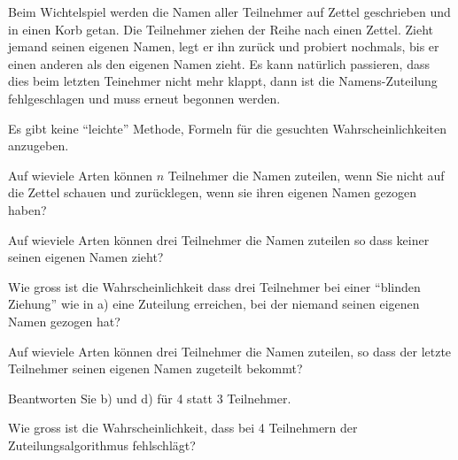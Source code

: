 Beim Wichtelspiel werden die Namen aller Teilnehmer auf Zettel geschrieben
und in einen Korb getan.
Die Teilnehmer ziehen der Reihe nach einen Zettel.
Zieht jemand seinen eigenen Namen, legt er ihn zurück und probiert
nochmals, bis er einen anderen als den eigenen Namen zieht.
Es kann natürlich passieren, dass dies beim letzten Teinehmer
nicht mehr klappt, dann ist die Namens-Zuteilung fehlgeschlagen und
muss erneut begonnen werden.

\begin{hinweis}
Es gibt keine ``leichte'' Methode, Formeln für die gesuchten
Wahrscheinlichkeiten anzugeben.
\end{hinweis}

\begin{teilaufgaben}
\item Auf wieviele Arten können $n$ Teilnehmer die Namen zuteilen,
wenn Sie nicht auf die Zettel schauen und zurücklegen, wenn sie ihren
eigenen Namen gezogen haben?
\item Auf wieviele Arten können drei Teilnehmer die Namen zuteilen
so dass keiner seinen eigenen Namen zieht?
\item Wie gross ist die Wahrscheinlichkeit dass drei Teilnehmer
bei einer ``blinden Ziehung'' wie in a) eine Zuteilung erreichen, bei
der niemand seinen eigenen Namen gezogen hat?
\item Auf wieviele Arten können drei Teilnehmer die Namen zuteilen,
so dass der letzte Teilnehmer seinen eigenen Namen zugeteilt bekommt?
\item Beantworten Sie b) und d) für 4 statt 3 Teilnehmer.
\item Wie gross ist die Wahrscheinlichkeit, dass bei 4 Teilnehmern
der Zuteilungsalgorithmus fehlschlägt?
\end{teilaufgaben}

